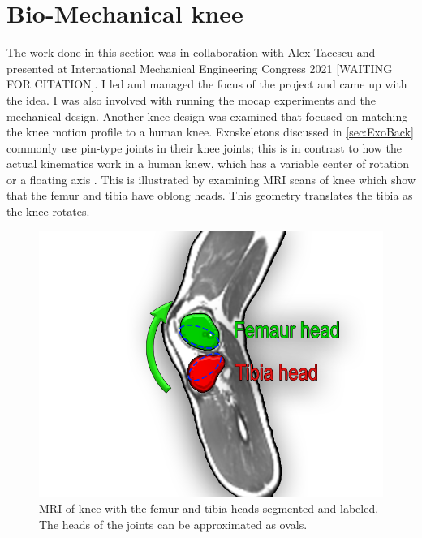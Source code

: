 \section{Bio-Mechanical knee}

The work done in this section was in collaboration with Alex Tacescu \cite{tacescu2021development} and presented at International Mechanical Engineering Congress 2021 [WAITING FOR CITATION]. I led and managed the focus of the project and came up with the idea. I was also involved with running the mocap experiments and the mechanical design. Another knee design was examined that focused on matching the knee motion profile to a human knee. Exoskeletons discussed in \autoref{sec:ExoBack} commonly use pin-type joints in their knee joints; this is in contrast to how the actual kinematics work in a human knew, which has a variable center of rotation or a floating axis \cite{morrison1970mechanics} \cite{koo2008knee} \cite{grood1983joint}.  This is illustrated by examining MRI scans of knee which show that the femur and tibia have oblong heads\cite{MRIKneeScan}. This geometry translates the tibia as the knee rotates. 




\begin{figure}[h!]
    \centering
    \includegraphics[scale=0.5]{images/mech_design/MRI_knee_label.png}
    \caption[Labled MRI of knee]{MRI of knee with the femur and tibia heads segmented and labeled. The heads of the joints can be approximated as ovals. }
    \label{fig:MRIKnee}
\end{figure}

